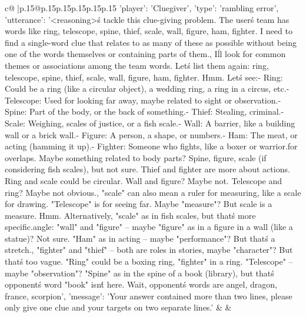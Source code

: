 \documentclass{article}
\begin{document}
{\begin{supertabular}{c@{$\;$}|p{.15\linewidth}@{}p{.15\linewidth}p{.15\linewidth}p{.15\linewidth}p{.15\linewidth}p{.15\linewidth}}
{{{                {'player': 'Cluegiver', 'type': 'rambling error', 'utterance': '<reasoning>\nLet\'s tackle this clue-giving problem. The user\'s team has words like ring, telescope, spine, thief, scale, wall, figure, ham, fighter. I need to find a single-word clue that relates to as many of these as possible without being one of the words themselves or containing parts of them.\n\nFirst, I\'ll look for common themes or associations among the team words. Let\'s list them again: ring, telescope, spine, thief, scale, wall, figure, ham, fighter. Hmm. Let\'s see:\n\n- Ring: Could be a ring (like a circular object), a wedding ring, a ring in a circus, etc.\n- Telescope: Used for looking far away, maybe related to sight or observation.\n- Spine: Part of the body, or the back of something.\n- Thief: Stealing, criminal.\n- Scale: Weighing, scales of justice, or a fish scale.\n- Wall: A barrier, like a building wall or a brick wall.\n- Figure: A person, a shape, or numbers.\n- Ham: The meat, or acting (hamming it up).\n- Fighter: Someone who fights, like a boxer or warrior.\n\nLooking for overlaps. Maybe something related to body parts? Spine, figure, scale (if considering fish scales), but not sure. Thief and fighter are more about actions. Ring and scale could be circular. Wall and figure? Maybe not. Telescope and ring? Maybe not obvious.\n\nWait, "scale" can also mean a ruler for measuring, like a scale for drawing. "Telescope" is for seeing far. Maybe "measure"? But scale is a measure. Hmm. Alternatively, "scale" as in fish scales, but that\'s more specific.\n\nAnother angle: "wall" and "figure" – maybe "figure" as in a figure in a wall (like a statue)? Not sure. "Ham" as in acting – maybe "performance"? But that\'s a stretch.\n\nWait, "fighter" and "thief" – both are roles in stories, maybe "character"? But that\'s too vague. "Ring" could be a boxing ring, "fighter" in a ring. "Telescope" – maybe "observation"? "Spine" as in the spine of a book (library), but that\'s opponent\'s word "book" isn\'t here. Wait, opponent\'s words are angel, dragon, france, scorpion', 'message': 'Your answer contained more than two lines, please only give one clue and your targets on two separate lines.'}
            }
        }
    }
    & & \\ \\

\end{supertabular}
}
\end{document}
